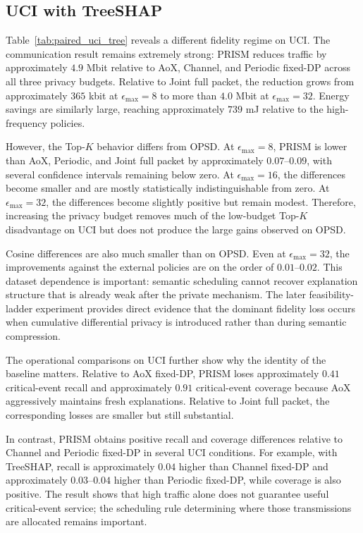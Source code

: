 \documentclass[11pt]{article}
\begin{document}
\subsection{UCI with TreeSHAP}

Table~\ref{tab:paired_uci_tree} reveals a different fidelity regime on UCI. The communication result remains extremely strong: PRISM reduces traffic by approximately $4.9$ Mbit relative to AoX, Channel, and Periodic fixed-DP across all three privacy budgets. Relative to Joint full packet, the reduction grows from approximately $365$ kbit at $\epsilon_{\max}=8$ to more than $4.0$ Mbit at $\epsilon_{\max}=32$. Energy savings are similarly large, reaching approximately $739$ mJ relative to the high-frequency policies.

However, the Top-$K$ behavior differs from OPSD. At $\epsilon_{\max}=8$, PRISM is lower than AoX, Periodic, and Joint full packet by approximately $0.07$--$0.09$, with several confidence intervals remaining below zero. At $\epsilon_{\max}=16$, the differences become smaller and are mostly statistically indistinguishable from zero. At $\epsilon_{\max}=32$, the differences become slightly positive but remain modest. Therefore, increasing the privacy budget removes much of the low-budget Top-$K$ disadvantage on UCI but does not produce the large gains observed on OPSD.

Cosine differences are also much smaller than on OPSD. Even at $\epsilon_{\max}=32$, the improvements against the external policies are on the order of $0.01$--$0.02$. This dataset dependence is important: semantic scheduling cannot recover explanation structure that is already weak after the private mechanism. The later feasibility-ladder experiment provides direct evidence that the dominant fidelity loss occurs when cumulative differential privacy is introduced rather than during semantic compression.

The operational comparisons on UCI further show why the identity of the baseline matters. Relative to AoX fixed-DP, PRISM loses approximately $0.41$ critical-event recall and approximately $0.91$ critical-event coverage because AoX aggressively maintains fresh explanations. Relative to Joint full packet, the corresponding losses are smaller but still substantial.

In contrast, PRISM obtains positive recall and coverage differences relative to Channel and Periodic fixed-DP in several UCI conditions. For example, with TreeSHAP, recall is approximately $0.04$ higher than Channel fixed-DP and approximately $0.03$--$0.04$ higher than Periodic fixed-DP, while coverage is also positive. The result shows that high traffic alone does not guarantee useful critical-event service; the scheduling rule determining where those transmissions are allocated remains important.
\end{document}
